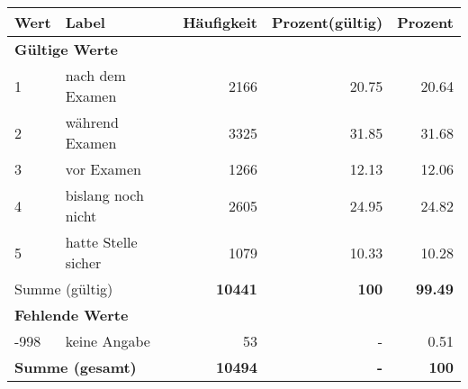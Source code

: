      \begin{longtable}{lXrrr}
     \toprule
     \textbf{Wert} & \textbf{Label} & \textbf{Häufigkeit} & \textbf{Prozent(gültig)} & \textbf{Prozent} \\
     \endhead
     \midrule
     \multicolumn{5}{l}{\textbf{Gültige Werte}}\\

     1 &
     \multicolumn{1}{X}{ nach dem Examen   } &


       \num{2166} &
       \num[round-mode=places,round-precision=2]{20,75} &
         \num[round-mode=places,round-precision=2]{20,64} \\

     2 &
     \multicolumn{1}{X}{ während Examen   } &


       \num{3325} &
       \num[round-mode=places,round-precision=2]{31,85} &
         \num[round-mode=places,round-precision=2]{31,68} \\

     3 &
     \multicolumn{1}{X}{ vor Examen   } &


       \num{1266} &
       \num[round-mode=places,round-precision=2]{12,13} &
         \num[round-mode=places,round-precision=2]{12,06} \\

     4 &
     \multicolumn{1}{X}{ bislang noch nicht   } &


       \num{2605} &
       \num[round-mode=places,round-precision=2]{24,95} &
         \num[round-mode=places,round-precision=2]{24,82} \\

     5 &
     \multicolumn{1}{X}{ hatte Stelle sicher   } &


       \num{1079} &
       \num[round-mode=places,round-precision=2]{10,33} &
         \num[round-mode=places,round-precision=2]{10,28} \\
     \midrule
     \multicolumn{2}{l}{Summe (gültig)} &
       \textbf{\num{10441}} &
     \textbf{100} &
       \textbf{\num[round-mode=places,round-precision=2]{99,49}} \\
     \multicolumn{5}{l}{\textbf{Fehlende Werte}}\\
       -998 &
       keine Angabe &
         \num{53} &
        - &
         \num[round-mode=places,round-precision=2]{0,51} \\
     \midrule
     \multicolumn{2}{l}{\textbf{Summe (gesamt)}} &
          \textbf{\num{10494}} &
        \textbf{-} &
        \textbf{100} \\
     \bottomrule
     \end{longtable}
     
